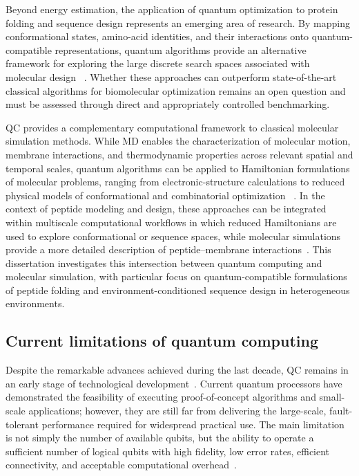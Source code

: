 Beyond energy estimation, the application of quantum optimization to protein folding and sequence design represents an emerging area of research. By mapping conformational states, amino-acid identities, and their interactions onto quantum-compatible representations, quantum algorithms provide an alternative framework for exploring the large discrete search spaces associated with molecular design ~\cite{robert2021resource}. Whether these approaches can outperform state-of-the-art classical algorithms for biomolecular optimization remains an open question and must be assessed through direct and appropriately controlled benchmarking.

QC provides a complementary computational framework to classical molecular simulation methods. While MD enables the characterization of molecular motion, membrane interactions, and thermodynamic properties across relevant spatial and temporal scales, quantum algorithms can be applied to Hamiltonian formulations of molecular problems, ranging from electronic-structure calculations to reduced physical models of conformational and combinatorial optimization ~\cite{Bidart2026}. In the context of peptide modeling and design, these approaches can be integrated within multiscale computational workflows in which reduced Hamiltonians are used to explore conformational or sequence spaces, while molecular simulations provide a more detailed description of peptide–membrane interactions~\cite{avances_1}. This dissertation investigates this intersection between quantum computing and molecular simulation, with particular focus on quantum-compatible formulations of peptide folding and environment-conditioned sequence design in heterogeneous environments.


\subsection{Current limitations of quantum computing}

Despite the remarkable advances achieved during the last decade, QC remains in an early stage of technological development~\cite{paper_dani}. Current quantum processors have demonstrated the feasibility of executing proof-of-concept algorithms and small-scale applications; however, they are still far from delivering the large-scale, fault-tolerant performance required for widespread practical use. The main limitation is not simply the number of available qubits, but the ability to operate a sufficient number of logical qubits with high fidelity, low error rates, efficient connectivity, and acceptable computational overhead~\cite{Palsberg2026,Erol2025}.

